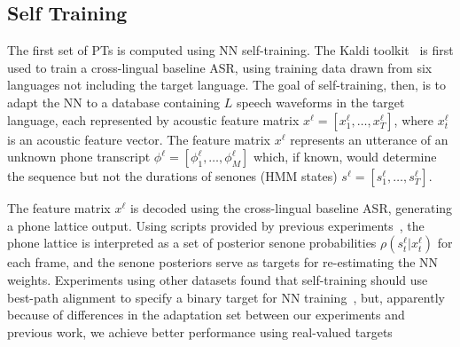 \subsection{Self Training}
\label{sec:selftraining}

The first set of PTs is computed using NN self-training.
The Kaldi toolkit~\cite{Kaldi2011} is first used to train a
cross-lingual baseline ASR, using training data drawn from six
languages not including the target language.  The goal of
self-training, then, is to adapt the NN to a database containing
$L$ speech waveforms in the target language, each represented by
acoustic feature matrix $x^\ell =[x_1^\ell,\ldots,x_T^\ell]$, where
$x_t^\ell$ is an acoustic feature vector.  The feature matrix $x^\ell$
represents an utterance of an unknown phone transcript
$\phi^\ell=[\phi_1^\ell,\ldots,\phi_M^\ell]$ which, if known, would
determine the sequence but not the durations of senones (HMM states)
$s^\ell =[s_1^\ell,\ldots,s_T^\ell]$.

The feature matrix $x^\ell$ is decoded using the cross-lingual
baseline ASR, generating a phone lattice output.  Using scripts
provided by previous experiments~\cite{vesely2013-semi}, the phone
lattice is interpreted as a set of posterior senone probabilities
$\rho(s_t^\ell|x_t^\ell)$ for each frame, and the senone posteriors
serve as targets for re-estimating the NN weights.
Experiments using other datasets found that self-training
should use best-path alignment to specify a binary target for NN
training~\cite{vesely2013-semi}, but, apparently because of
differences in the adaptation set between our experiments and previous
work, we achieve better performance using real-valued targets
